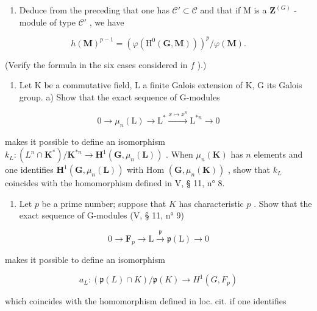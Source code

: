 \begin{enumerate}
\def\labelenumi{\alph{enumi})}
\setcounter{enumi}{6}
\tightlist
\item
  Deduce from the preceding that one has \(\mathcal{C}' \subset \mathcal{C}\) and that if M is a \(\mathbf{Z}^{(G)}\) -module of type \(\mathcal{C}'\) , we have
\end{enumerate}

\[
h (\mathbf {M}) ^ {p - 1} = \left(\varphi \left(\mathrm{H} ^ {0} (\mathbf {G}, \mathbf {M})\right)\right) ^ {p} / \varphi (\mathbf {M}).
\]

(Verify the formula in the six cases considered in \(f\) ).)

\begin{enumerate}
\def\labelenumi{\arabic{enumi})}
\setcounter{enumi}{21}
\tightlist
\item
  Let K be a commutative field, L a finite Galois extension of K, G its Galois group. a) Show that the exact sequence of G-modules
\end{enumerate}

\[
0 \rightarrow \mu_ {n} (\mathrm{L}) \rightarrow \mathrm{L} ^ {*} \xrightarrow {x \mapsto x ^ {n}} \mathrm{L} ^ {* n} \rightarrow 0
\]

makes it possible to define an isomorphism \(k_{L}:(L^{n}\cap\mathbf{K}^{*})/\mathbf{K}^{*n}\to\mathbf{H}^{1}(\mathbf{G},\mu_{n}(\mathbf{L}))\) . When \(\mu_{n}(\mathbf{K})\) has \(n\) elements and one identifies \(\mathbf{H}^{1}(\mathbf{G},\mu_{n}(\mathbf{L}))\) with Hom \((\mathbf{G},\mu_{n}(\mathbf{K}))\) , show that \(k_{L}\) coincides with the homomorphism defined in V, § 11, n° 8.

\begin{enumerate}
\def\labelenumi{\alph{enumi})}
\setcounter{enumi}{1}
\tightlist
\item
  Let \(p\) be a prime number; suppose that \(K\) has characteristic \(p\) . Show that the exact sequence of G-modules (V, § 11, n° 9)
\end{enumerate}

\[
0 \to \mathbf {F} _ {p} \to \mathrm{L} \stackrel {{\mathfrak {p}}} {{\to}} \mathfrak {p} (\mathrm{L}) \to 0
\]

makes it possible to define an isomorphism

\[
a _ {L}: (\mathfrak {p} (L) \cap K) / \mathfrak {p} (K) \rightarrow H ^ {1} (G, F _ {p})
\]

which coincides with the homomorphism defined in loc. cit. if one identifies

